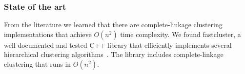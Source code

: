 \subsubsection*{State of the art}
From the literature we learned that there are complete-linkage clustering implementations that achieve $O(n^2)$ time complexity.
We found fastcluster, a well-documented and tested C++ library that efficiently implements several hierarchical clustering algorithms~\cite{mullner2011modern, FastClust}.
The library includes complete-linkage clustering that runs in $O(n^2)$.


